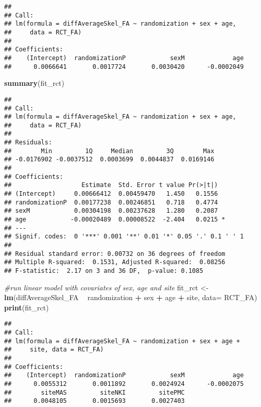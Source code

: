\documentclass[]{article}
\newenvironment{Shaded}{\begin{snugshade}}{\end{snugshade}}
\newcommand{\KeywordTok}[1]{\textcolor[rgb]{0.13,0.29,0.53}{\textbf{#1}}}
\newcommand{\DataTypeTok}[1]{\textcolor[rgb]{0.13,0.29,0.53}{#1}}
\newcommand{\StringTok}[1]{\textcolor[rgb]{0.31,0.60,0.02}{#1}}
\newcommand{\CommentTok}[1]{\textcolor[rgb]{0.56,0.35,0.01}{\textit{#1}}}
\newcommand{\OperatorTok}[1]{\textcolor[rgb]{0.81,0.36,0.00}{\textbf{#1}}}
\newcommand{\NormalTok}[1]{#1}
\theoremstyle{definition}
\theoremstyle{definition}
\theoremstyle{definition}
\theoremstyle{remark}
\begin{document}
\begin{verbatim}
## 
## Call:
## lm(formula = diffAverageSkel_FA ~ randomization + sex + age, 
##     data = RCT_FA)
## 
## Coefficients:
##    (Intercept)  randomizationP            sexM             age  
##      0.0066641       0.0017724       0.0030420      -0.0002049
\end{verbatim}

\begin{Shaded}
\begin{Highlighting}[]
\KeywordTok{summary}\NormalTok{(fit_rct)}
\end{Highlighting}
\end{Shaded}

\begin{verbatim}
## 
## Call:
## lm(formula = diffAverageSkel_FA ~ randomization + sex + age, 
##     data = RCT_FA)
## 
## Residuals:
##        Min         1Q     Median         3Q        Max 
## -0.0176902 -0.0037512  0.0003699  0.0044837  0.0169146 
## 
## Coefficients:
##                   Estimate  Std. Error t value Pr(>|t|)  
## (Intercept)     0.00666412  0.00459470   1.450   0.1556  
## randomizationP  0.00177238  0.00246851   0.718   0.4774  
## sexM            0.00304198  0.00237628   1.280   0.2087  
## age            -0.00020489  0.00008522  -2.404   0.0215 *
## ---
## Signif. codes:  0 '***' 0.001 '**' 0.01 '*' 0.05 '.' 0.1 ' ' 1
## 
## Residual standard error: 0.00732 on 36 degrees of freedom
## Multiple R-squared:  0.1531, Adjusted R-squared:  0.08256 
## F-statistic:  2.17 on 3 and 36 DF,  p-value: 0.1085
\end{verbatim}

\begin{Shaded}
\begin{Highlighting}[]
\CommentTok{#run linear model with covariates of sex, age and site}
\NormalTok{fit_rct <-}\StringTok{ }\KeywordTok{lm}\NormalTok{(diffAverageSkel_FA }\OperatorTok{~}\StringTok{ }\NormalTok{randomization }\OperatorTok{+}\StringTok{ }\NormalTok{sex }\OperatorTok{+}\StringTok{ }\NormalTok{age }\OperatorTok{+}\StringTok{ }\NormalTok{site, }\DataTypeTok{data=}\NormalTok{ RCT_FA)}
\KeywordTok{print}\NormalTok{(fit_rct)}
\end{Highlighting}
\end{Shaded}

\begin{verbatim}
## 
## Call:
## lm(formula = diffAverageSkel_FA ~ randomization + sex + age + 
##     site, data = RCT_FA)
## 
## Coefficients:
##    (Intercept)  randomizationP            sexM             age  
##      0.0055312       0.0011892       0.0024924      -0.0002075  
##        siteMAS         siteNKI         sitePMC  
##      0.0048105       0.0015693       0.0027403
\end{verbatim}
\end{document}
